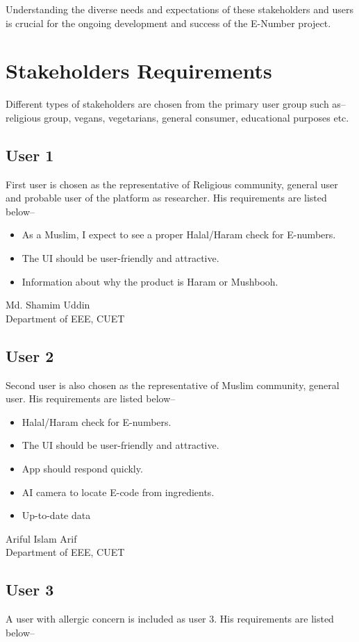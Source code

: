 \documentclass[a4paper,12pt]{report}
\begin{document}
Understanding the diverse needs and expectations of these stakeholders and users is crucial for the ongoing development and success of the E-Number project.
\section*{Stakeholders Requirements}
Different types of stakeholders are chosen from the primary user group such as-- religious group, vegans, vegetarians, general consumer, educational purposes etc.
\subsection*{User 1}
First user is chosen as the representative of Religious community, general user and probable user of the platform as researcher. His requirements are listed below--

\parbox{.7\linewidth}{
	\begin{itemize}
		\item As a Muslim, I expect to see a proper Halal/Haram check for E-numbers.
		\item The UI should be user-friendly and attractive.
		\item Information about why the product is Haram or Mushbooh.
	\end{itemize}
}
\parbox[m]{.3\linewidth}{
\raggedleft
Md. Shamim Uddin\\
{\footnotesize
Department of EEE, CUET}
}
\subsection*{User 2}
Second user is also chosen as the representative of Muslim community, general user. His requirements are listed below--

\parbox{.7\linewidth}{
	\begin{itemize}
		\item Halal/Haram check for E-numbers.
		\item The UI should be user-friendly and attractive.
		\item App should respond quickly.
		\item AI camera to locate E-code from ingredients.
		\item Up-to-date data
	\end{itemize}
}
\parbox[m]{.3\linewidth}{
\raggedleft
Ariful Islam Arif\\
{\footnotesize
Department of EEE, CUET}
}

\subsection*{User 3}
A user with allergic concern is included as user 3. His requirements are listed below--
\end{document}
